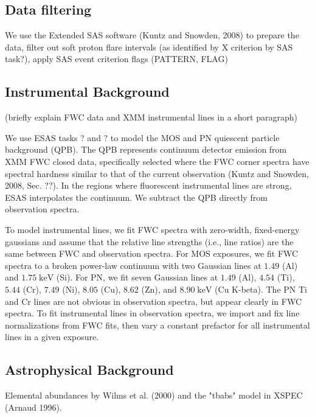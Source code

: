 \documentclass[preprint2,tighten,trackchanges]{aastex6}
\newcommand*{\mt}{\mathrm}
\newcommand*{\unit}[1]{\;\mt{#1}}  %
\begin{document}
\subsection{Data filtering}

We use the Extended SAS software (Kuntz and Snowden, 2008)
to prepare the data, filter out soft proton flare intervals (as identified by X
criterion by SAS task?),
apply SAS event criterion flags (PATTERN, FLAG)

\subsection{Instrumental Background}

(briefly explain FWC data and XMM instrumental lines in a short paragraph)

We use ESAS tasks ? and ? to model the MOS and PN quiescent particle background
(QPB).
The QPB represents continuum detector emission from XMM FWC closed data,
specifically selected where the FWC corner spectra have spectral hardness
similar to that of the current observation (Kuntz and Snowden, 2008, Sec. ??).
In the regions where fluorescent instrumental lines are strong, ESAS
interpolates the continuum.  We subtract the QPB directly from observation
spectra.

To model instrumental lines, we fit FWC spectra with zero-width, fixed-energy
gaussians and assume that the relative line strengths (i.e., line ratios) are
the same between FWC and observation spectra.
For MOS exposures, we fit FWC spectra to a broken power-law continuum with two
Gaussian lines at $1.49$ (Al) and $1.75 \unit{keV}$ (Si).
For PN, we fit seven Gaussian lines at $1.49$ (Al), $4.54$ (Ti), $5.44$ (Cr),
$7.49$ (Ni), $8.05$ (Cu), $8.62$ (Zn), and $8.90 \unit{keV}$ (Cu K-beta).
The PN Ti and Cr lines are not obvious in observation spectra, but
appear clearly in FWC spectra.
To fit instrumental lines in observation spectra, we import and fix line
normalizations from FWC fits, then vary a constant prefactor for all
instrumental lines in a given exposure.

\subsection{Astrophysical Background}

Elemental abundances by Wilms et al. (2000)
and the "tbabs" model in XSPEC (Arnaud 1996).
\end{document}
